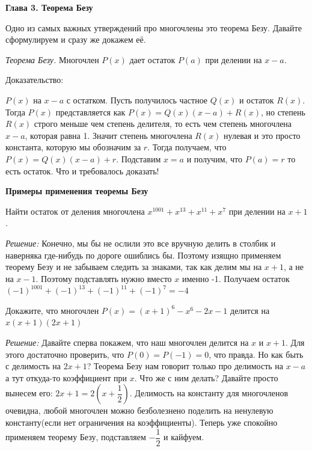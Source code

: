 \newpage

\hspace{3mm}

\textbf{\Large Глава 3. Теорема Безу}

Одно из самых важных утверждений про многочлены это теорема Безу. Давайте сформулируем и сразу же докажем её.

\textit{Теорема Безу.} Многочлен $P(x)$ дает остаток $P(a)$ при делении на $x-a$.

Доказательство:

 $P(x)$ на $x-a$ с остатком. Пусть получилось частное $Q(x)$ и остаток $R(x)$. Тогда $P(x)$ представляется как $P(x) = Q(x)(x-a)+R(x)$, но степень $R(x)$ строго меньше чем степень делителя, то есть чем степень многочлена $x-a$, которая равна 1. Значит степень многочлена $R(x)$ нулевая и это просто константа, которую мы обозначим за $r$. Тогда получаем, что $P(x) = Q(x)(x-a)+r$. Подставим $x=a$ и получим, что $P(a)=r$ то есть остаток. Что и требовалось доказать!

\textbf{Примеры применения теоремы Безу}

 Найти остаток от деления многочлена $x^{1001} + x^{13} + x^{11} + x^{7}$ при делении на $x+1$.

\textit{Решение: }Конечно, мы бы не ослили это все вручную делить в столбик и наверняка где-нибудь по дороге ошиблись бы. Поэтому изящно применяем теорему Безу и не забываем следить за знаками, так как делим мы на $x+1$, а не на $x-1$. Поэтому подставлять нужно вместо $x$ именно -1. Получаем остаток $(-1)^{1001}+(-1)^{13}+(-1)^{11}+(-1)^{7}=-4$

 Докажите, что многочлен $P(x) = (x+1)^6 - x^6 - 2x-1$ делится на $x(x+1)(2x+1)$

\textit{Решение: }Давайте сперва покажем, что наш многочлен делится на $x$ и $x+1$. Для этого достаточно проверить, что $P(0) = P(-1) = 0$, что правда. Но как быть с делимость на $2x+1$? Теорема Безу нам говорит только про делимость на $x-a$ а тут откуда-то коэффициент при $x$. Что же с ним делать? Давайте просто вынесем его: $2x+1=2(x+\dfrac{1}{2})$. Делимость на константу для многочленов очевидна, любой многочлен можно безболезнено поделить на ненулевую константу(если нет ограничения на коэффициенты). Теперь уже спокойно применяем теорему Безу, подставляем $-\dfrac{1}{2}$ и кайфуем.


\newpage

\hspace{3mm}

